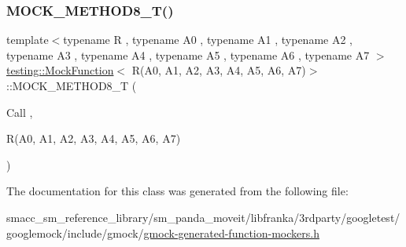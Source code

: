 \mbox{\label{classtesting_1_1MockFunction_3_01R_07A0_00_01A1_00_01A2_00_01A3_00_01A4_00_01A5_00_01A6_00_01A7_08_4_a895c470e00e07294ab42c09588ae1e4c}} 
\subsubsection{\texorpdfstring{M\+O\+C\+K\+\_\+\+M\+E\+T\+H\+O\+D8\+\_\+\+T()}{MOCK\_METHOD8\_T()}}
{\footnotesize\ttfamily template$<$typename R , typename A0 , typename A1 , typename A2 , typename A3 , typename A4 , typename A5 , typename A6 , typename A7 $>$ \\
\hyperlink{classtesting_1_1MockFunction}{testing\+::\+Mock\+Function}$<$ R(A0, A1, A2, A3, A4, A5, A6, A7)$>$\+::M\+O\+C\+K\+\_\+\+M\+E\+T\+H\+O\+D8\+\_\+T (\begin{DoxyParamCaption}\item[{Call}]{,  }\item[{R(A0, A1, A2, A3, A4, A5, A6, A7)}]{ }\end{DoxyParamCaption})}



The documentation for this class was generated from the following file\+:\begin{DoxyCompactItemize}
\item 
smacc\+\_\+sm\+\_\+reference\+\_\+library/sm\+\_\+panda\+\_\+moveit/libfranka/3rdparty/googletest/googlemock/include/gmock/\hyperlink{gmock-generated-function-mockers_8h}{gmock-\/generated-\/function-\/mockers.\+h}\end{DoxyCompactItemize}
